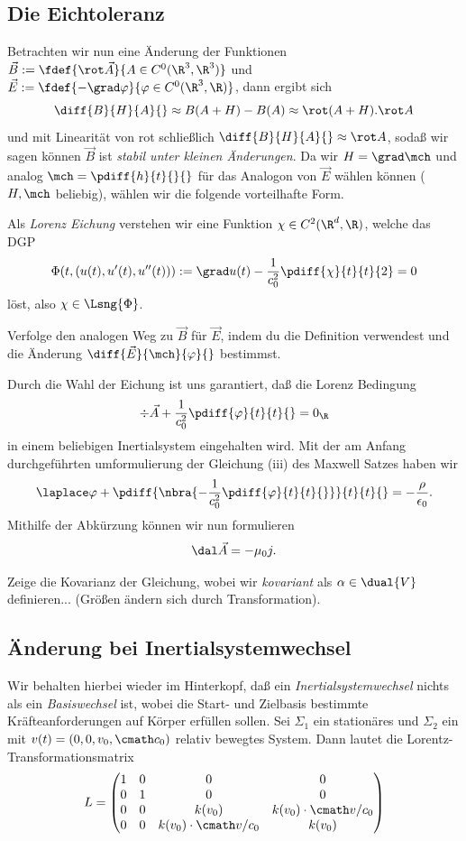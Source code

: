 \documentclass[../WiSe22ANA3.tex]{subfiles}
\begin{document}
			\subsection*{Die Eichtoleranz}
				Betrachten wir nun eine Änderung der Funktionen $\vec B:=\fdef{\rot\vec A}{A\in C^0(\R^3,\R^3)}$ und $\vec E:=\fdef{-\grad\varphi}{\varphi\in C^0(\R^3,\R)}$, dann ergibt sich
				$$\diff{B}{H}{A}{}\approx B(A+H)-B(A)\approx \rot(A+H).\rot A$$
				und mit Linearität von rot schließlich $\diff{B}{H}{A}{}\approx\rot A$, sodaß wir sagen können $\vec B$ ist \emph{stabil unter kleinen Änderungen}. Da wir $H=\grad\mch$ und analog $\mch=\pdiff{h}{t}{}{	}$ für das Analogon von $\vec E$ wählen können ($H,\mch$ beliebig), wählen wir die folgende vorteilhafte Form.
				\begin{info}
					Als \emph{Lorenz Eichung} verstehen wir eine Funktion $\chi\in C^2(\R^d,\R)$, welche das DGP 
					$$\Phi(t,(u(t),u'(t),u''(t))):=\grad u(t)-\frac{1}{c_0^2}\pdiff{\chi}{t}{t}{2}=0$$
					löst, also $\chi\in\Lsng{\Phi}$. 
				\end{info}
				\begin{Aufgabe}
					\nr[EFeldLsng] Verfolge den analogen Weg zu $\vec B$ für $\vec E$, indem du die Definition verwendest und die Änderung $\diff{\vec E}{\mch}{\varphi}{}$ bestimmst. 
				\end{Aufgabe} 
				Durch die Wahl der Eichung ist uns garantiert, daß die Lorenz Bedingung
				$$\div\vec A+\frac{1}{c_0^2}\pdiff{\varphi}{t}{t}{}=0_\R$$
				in einem beliebigen Inertialsystem eingehalten wird. Mit der am Anfang durchgeführten umformulierung der Gleichung (iii) des Maxwell Satzes haben wir  
				$$\laplace\varphi+\pdiff{\nbra{-\frac{1}{c_0^2}\pdiff{\varphi}{t}{t}{}}}{t}{t}{}=-\frac{\rho}{\epsilon_0}.$$
				\InfoblockDAlembertOperatorDef
				Mithilfe der Abkürzung können wir nun formulieren
				$$\dal\vec A=-\mu_0 j.$$
				\begin{Aufgabe}
					\nr Zeige die Kovarianz der Gleichung, wobei wir \emph{kovariant} als $\alpha\in\dual{V}$ definieren... (Größen ändern sich durch Transformation).
				\end{Aufgabe}
				
			\subsection*{Änderung bei Inertialsystemwechsel}
				Wir behalten hierbei wieder im Hinterkopf, daß ein \emph{Inertialsystemwechsel} nichts als ein \emph{Basiswechsel} ist, wobei die Start- und Zielbasis bestimmte Kräfteanforderungen auf Körper erfüllen sollen. Sei $\Sigma_1$ ein stationäres und $\Sigma_2$ ein mit $v(t)=(0,0,v_0,\cmath c_0)$ relativ bewegtes System. Dann lautet die Lorentz-Transformationsmatrix
				$$L=\begin{pmatrix}
					1 & 0 & 0 & 0 \\
					0 & 1 & 0 & 0 \\
					0 & 0 & k(v_0) & k(v_0)\cdot\cmath v/c_0 \\
					0 & 0 & k(v_0)\cdot\cmath v/c_0 & k(v_0)
				\end{pmatrix}$$
				
\end{document}

